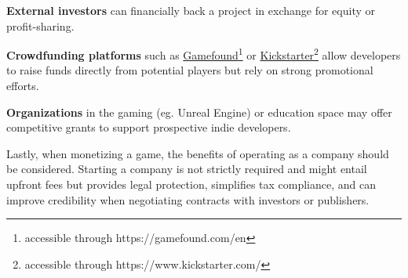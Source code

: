  \textbf{External investors} can financially back a project in exchange for equity or profit-sharing.\cite{perforce-stoftware_tips}

 \textbf{Crowdfunding platforms} such as \href{https://gamefound.com/en}{Gamefound}\footnote{accessible through https://gamefound.com/en} or \href{https://www.kickstarter.com/}{Kickstarter}\footnote{accessible through https://www.kickstarter.com/} allow developers to raise funds directly from potential players but rely on strong promotional efforts.\cite{perforce-stoftware_tips}

 \textbf{Organizations} in the gaming (eg. Unreal Engine) or education space may offer competitive grants to support prospective indie developers.\cite{perforce-stoftware_tips, unreal-engine_grants}

Lastly, when monetizing a game, the benefits of operating as a company should be considered. Starting a company is not strictly required and might entail upfront fees but provides legal protection, simplifies tax compliance, and can improve credibility when negotiating contracts with investors or publishers.\cite{expats_company-or-individual}